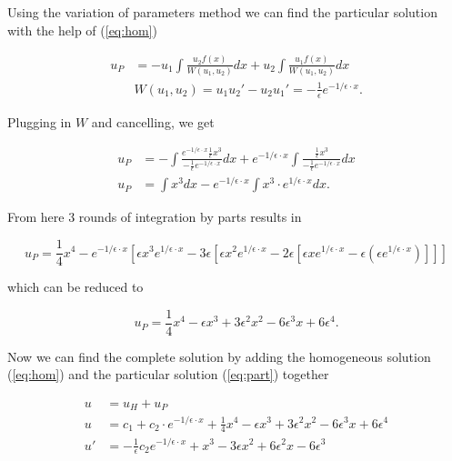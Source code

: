 \documentclass[a4paper, 12pt, reqno]{amsart}
\numberwithin{equation}{section}
\begin{document}
Using the variation of parameters method we can find the particular solution
with the help of (\ref{eq:hom})

\begin{equation}\nonumber
    \begin{aligned}
        u_P &= -u_1 \int{\frac{u_2 f(x)}{W(u_1,u_2)}}{dx} + 
            u_2 \int{\frac{u_1 f(x)}{W(u_1,u_2)}}{dx}           \\
        &W(u_1,u_2) = u_1 u_2' - u_2 u_1' = 
            -\frac{1}{\epsilon}e^{-1/\epsilon \cdot x}.
    \end{aligned}
\end{equation}

Plugging in $W$ and cancelling, we get 

\begin{equation}\nonumber
    \begin{aligned}
        u_P &= - \int{\frac{e^{-1/\epsilon\cdot x}\frac{1}{\epsilon}x^3}
            {-\frac{1}{\epsilon}e^{-1/\epsilon \cdot x}}}{dx} 
            + e^{-1/\epsilon \cdot x} \int{\frac{\frac{1}{\epsilon} x^3}
                {-\frac{1}{\epsilon}e^{-1/\epsilon \cdot x}}}{dx} \\
        u_P &= \int{x^3}{dx} - e^{-1/\epsilon \cdot x} 
            \int{x^3 \cdot e^{1/\epsilon \cdot x}}{dx}.
    \end{aligned}
\end{equation}

From here 3 rounds of integration by parts results in 

\begin{equation}\nonumber
    u_P = \frac{1}{4}x^4 - e^{-1/\epsilon \cdot x} 
        \left[ \epsilon x^3 e^{1/\epsilon \cdot x} -3\epsilon
        \left[ \epsilon x^2 e^{1/\epsilon \cdot x} -2\epsilon
        \left[ \epsilon x   e^{1/\epsilon \cdot x} -\epsilon
        \left(  \epsilon    e^{1/\epsilon \cdot x} \right) 
        \right] \right] \right]
\end{equation}

which can be reduced to 

\begin{equation}\label{eq:part}
    u_P = \frac{1}{4}x^4 - \epsilon x^3 + 3\epsilon^2 x^2 
        - 6 \epsilon^3 x + 6 \epsilon^4.
\end{equation}

Now we can find the complete solution by adding the homogeneous solution
(\ref{eq:hom}) and the particular solution (\ref{eq:part}) together

\begin{equation}\label{eq:comp}
    \begin{aligned}
        u &= u_H + u_P \\
        u &= c_1 + c_2 \cdot e^{-1/\epsilon \cdot x} + \frac{1}{4}x^4 
            - \epsilon x^3 + 3\epsilon^2 x^2 - 6 \epsilon^3 x + 6 \epsilon^4 \\
        u' &= -\frac{1}{\epsilon} c_2 e^{-1/\epsilon \cdot x} + x^3 
            - 3 \epsilon x^2 + 6\epsilon^2 x - 6 \epsilon^3
    \end{aligned}
\end{equation}
\end{document}

